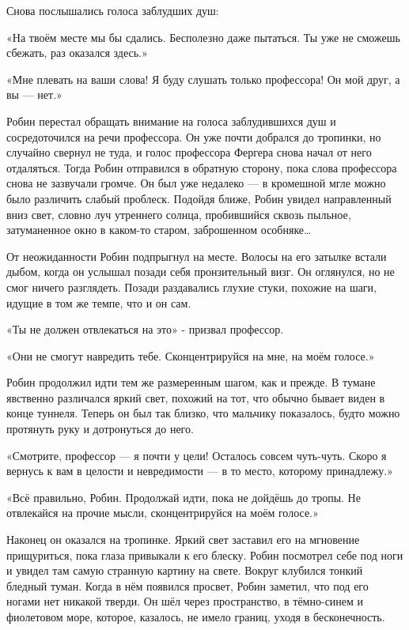 \documentclass[a4paper,12pt]{book}
\begin{document}
\par
Снова послышались голоса заблудших душ:
\par
«На твоём месте мы бы сдались. Бесполезно даже пытаться. Ты уже не сможешь сбежать, раз оказался здесь.»
\par
«Мне плевать на ваши слова! Я буду слушать только профессора! Он мой друг, а вы — нет.»\\
\par
Робин перестал обращать внимание на голоса заблудившихся душ и сосредоточился на речи профессора. Он уже почти добрался до тропинки, но случайно свернул не туда, и голос профессора Фергера снова начал от него отдаляться. Тогда Робин отправился в обратную сторону, пока слова профессора снова не зазвучали громче. Он был уже недалеко — в кромешной мгле можно было различить слабый проблеск. Подойдя ближе, Робин увидел направленный вниз свет, словно луч утреннего солнца, пробившийся сквозь пыльное, затуманенное окно в каком-то старом, заброшенном особняке…
\par
От неожиданности Робин подпрыгнул на месте. Волосы на его затылке встали дыбом, когда он услышал позади себя пронзительный визг. Он оглянулся, но не смог ничего разглядеть. Позади раздавались глухие стуки, похожие на шаги, идущие в том же темпе, что и он сам.
\par
«Ты не должен отвлекаться на это» - призвал профессор.
\par
«Они не смогут навредить тебе. Сконцентрируйся на мне, на моём голосе.»
\par
Робин продолжил идти тем же размеренным шагом, как и прежде. В тумане явственно различался яркий свет, похожий на тот, что обычно бывает виден в конце туннеля. Теперь он был так близко, что мальчику показалось, будто можно протянуть руку и дотронуться до него.
\par
«Смотрите, профессор — я почти у цели! Осталось совсем чуть-чуть. Скоро я вернусь к вам в целости и невредимости — в то место, которому принадлежу.»
\par
«Всё правильно, Робин. Продолжай идти, пока не дойдёшь до тропы. Не отвлекайся на прочие мысли, сконцентрируйся на моём голосе.»\\
\par
Наконец он оказался на тропинке. Яркий свет заставил его на мгновение прищуриться, пока глаза привыкали к его блеску. Робин посмотрел себе под ноги и увидел там самую странную картину на свете. Вокруг клубился тонкий бледный туман. Когда в нём появился просвет, Робин заметил, что под его ногами нет никакой тверди. Он шёл через пространство, в тёмно-синем и фиолетовом море, которое, казалось, не имело границ, уходя в бесконечность.
\end{document}
